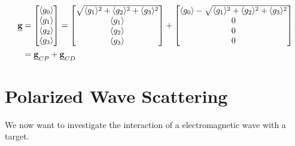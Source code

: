 \documentclass[11pt]{article}
\begin{document}
\begin{equation}
	\begin{split}
	\mathbf{\underline{g}} &= 
	\begin{bmatrix}
		\langle g_{0}\rangle\\
		\langle g_{1}\rangle\\
		\langle g_{2}\rangle\\
		\langle g_{3}\rangle
	\end{bmatrix}
	=
	\begin{bmatrix}
		\sqrt{\langle g_{1}\rangle^2 + \langle g_{2}\rangle^2 + \langle g_{3}\rangle^2} \\
		\langle g_{1}\rangle\\
		\langle g_{2}\rangle\\
		\langle g_{3}\rangle
	\end{bmatrix}
	+
	\begin{bmatrix}
		\langle g_{0}\rangle - \sqrt{\langle g_{1}\rangle^2 + \langle g_{2}\rangle^2 + \langle g_{3}\rangle^2} \\
		0\\
		0\\
		0\\
	\end{bmatrix}\\
	&=
	\mathbf{\underline{g}}_{CP} + \mathbf{\underline{g}}_{CD}
	\end{split}
\end{equation}
\section{Polarized Wave Scattering}
We now want to investigate the interaction of a electromagnetic wave with a target. 
\end{document}
